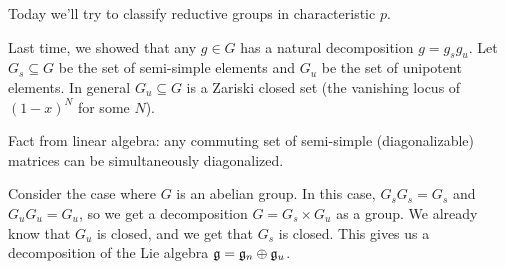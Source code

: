 
Today we'll try to classify reductive groups in characteristic $p$.

Last time, we showed that any $g\in G$ has a natural decomposition $g=g_sg_u$. Let $G_s\subseteq G$ be the set of semi-simple elements and $G_u$ be the set of unipotent elements. In general $G_u\subseteq G$ is a Zariski closed set (the vanishing locus of $(1-x)^N$ for some $N$).

Fact from linear algebra: any commuting set of semi-simple (diagonalizable) matrices can be simultaneously diagonalized.

Consider the case where $G$ is an abelian group. In this case, $G_sG_s=G_s$ and $G_uG_u=G_u$, so we get a decomposition $G=G_s\times G_u$ as a group. We already know that $G_u$ is closed, and we get that $G_s$ is closed. This gives us a decomposition of the Lie algebra $\mathfrak{g}=\mathfrak{g}_n\oplus \mathfrak{g}_u$.

